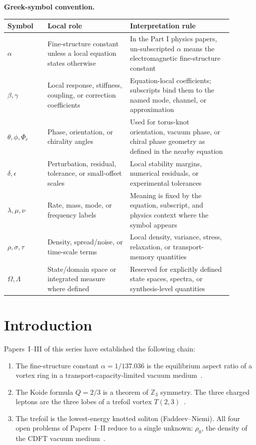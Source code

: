 \documentclass[11pt]{article}
\begin{document}
\noindent\textbf{Greek-symbol convention.}
\begin{center}
{\small
\begin{tabular}{p{0.16\linewidth}p{0.33\linewidth}p{0.41\linewidth}}
\hline
Symbol & Local role & Interpretation rule \\
\hline
$\alpha$ & Fine-structure constant unless a local equation states otherwise & In the Part I physics papers, un-subscripted $\alpha$ means the electromagnetic fine-structure constant \\
$\beta,\gamma$ & Local response, stiffness, coupling, or correction coefficients & Equation-local coefficients; subscripts bind them to the named mode, channel, or approximation \\
$\theta,\phi,\Phi_c$ & Phase, orientation, or chirality angles & Used for torus-knot orientation, vacuum phase, or chiral phase geometry as defined in the nearby equation \\
$\delta,\epsilon$ & Perturbation, residual, tolerance, or small-offset scales & Local stability margins, numerical residuals, or experimental tolerances \\
$\lambda,\mu,\nu$ & Rate, mass, mode, or frequency labels & Meaning is fixed by the equation, subscript, and physics context where the symbol appears \\
$\rho,\sigma,\tau$ & Density, spread/noise, or time-scale terms & Local density, variance, stress, relaxation, or transport-memory quantities \\
$\Omega,\Lambda$ & State/domain space or integrated measure where defined & Reserved for explicitly defined state spaces, spectra, or synthesis-level quantities \\
\hline
\end{tabular}
}
\end{center}


\section{Introduction}

Papers~I--III of this series have established the following chain:

\begin{enumerate}
  \item The fine-structure constant $\alpha = 1/137.036$ is the equilibrium
    aspect ratio of a vortex ring in a transport-capacity-limited vacuum
    medium~\cite{MujjabiI2026}.
  \item The Koide formula $Q = 2/3$ is a theorem of $\mathbb{Z}_3$ symmetry.
    The three charged leptons are the three lobes of a trefoil vortex
    $T(2,3)$~\cite{MujjabiII2026}.
  \item The trefoil is the lowest-energy knotted soliton (Faddeev--Niemi).
    All four open problems of Papers~I--II reduce to a single unknown:
    $\rho_0$, the density of the CDFT vacuum medium~\cite{MujjabiIII2026}.
\end{enumerate}
\end{document}
